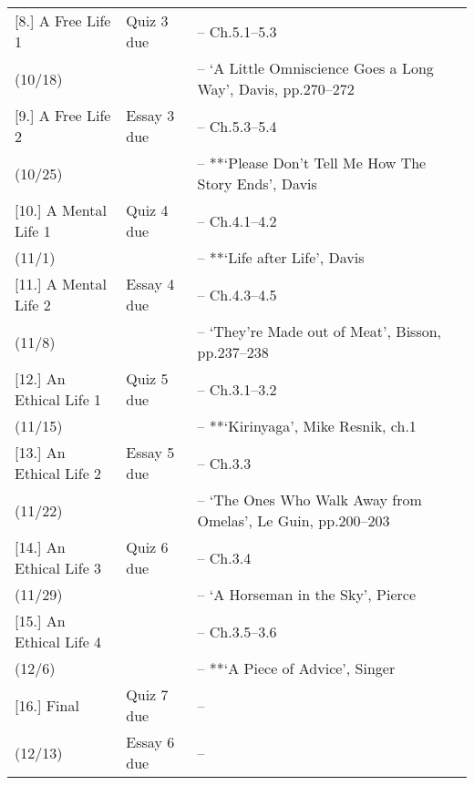 \documentclass[article,oneside]{memoir}
\begin{document}
\begin{center}
\begin{longtable}{p{4.5cm}p{2cm}>{-- }p{6cm}}
[8.] A Free Life 1 			& Quiz 3	due		& Ch.5.1--5.3 \\
(10/18)					& 				&  `A Little Omniscience Goes a Long Way', Davis, pp.270--272 \\  [1.8\baselineskip] \hline

[9.] A Free Life 2 			& Essay 3 due		&  Ch.5.3--5.4\\
(10/25)					&				& **`Please Don't Tell Me How The Story Ends', Davis \\  [1.8\baselineskip] \hline

[10.] A Mental Life 1			& Quiz 4	due		& Ch.4.1--4.2 \\
(11/1)					&				& **`Life after Life', Davis\\ [1.8\baselineskip] \hline
						
[11.] A Mental Life 2 			& Essay 4	 due		& Ch.4.3--4.5 \\
(11/8)					&				& `They're Made out of Meat', Bisson, pp.237--238 \\ [1.8\baselineskip] \hline
 

[12.] An Ethical Life 1 		& Quiz 5 due		& Ch.3.1--3.2\\
(11/15)					&				& **`Kirinyaga', Mike Resnik, ch.1 \\ [1.8\baselineskip] \hline


[13.] An Ethical Life 2		& Essay 5  due		&  Ch.3.3 \\ 
(11/22)					&				& `The Ones Who Walk Away from Omelas', Le Guin, pp.200--203 \\ [1.8\baselineskip] \hline
						
[14.] An Ethical Life 3		& Quiz 6 due		&  Ch.3.4\\
(11/29)					&				&  `A Horseman in the Sky', Pierce \\ [1.8\baselineskip] \hline

[15.] An Ethical Life 4		&		 		& Ch.3.5--3.6 \\ 
(12/6)					&				&  **`A Piece of Advice', Singer \\  [1.8\baselineskip] \hline

[16.] Final					& Quiz 7 due			&  \\ 
(12/13)					& Essay 6 due			&  \\  [1.8\baselineskip] \hline




\end{longtable}
\end{center}



\end{document}
